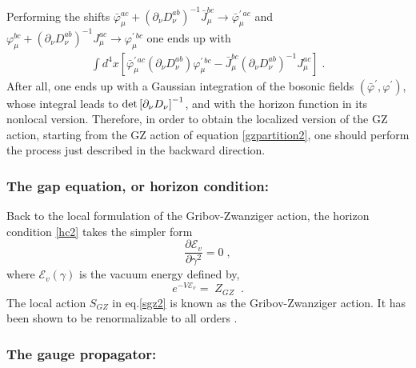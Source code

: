 Performing the shifts $ {\bar\varphi}^{ac}_{\mu}  + (\partial_\nu D^{ab}_{\nu}
)^{-1}\bar{J}^{bc}_{\mu} \to \bar{\varphi}^{\prime\, ac}_{\mu}$ and
$ \varphi^{bc}_{\mu} + (\partial_\nu D^{ab}_{\nu})^{-1} J^{ac}_{\mu} \to \varphi^{\prime\,
bc}_{\mu}$ one ends up with
\begin{eqnarray}
\int d^{4}x \left[ 
{\bar \varphi}^{\prime\, ac}_{\mu} (\partial_\nu D^{ab}_{\nu} ) \varphi^{\prime\, bc}_{\mu}  
- \bar{J}^{bc}_{\mu}(\partial_\nu D^{ab}_{\nu} )^{-1}J^{ac}_{\mu}
\right]\;.
\label{act10}
\end{eqnarray}
After all, one ends up with a Gaussian integration of the bosonic fields
$(\bar{\varphi}^{\prime},\varphi^{\prime})$, whose integral leads to $\det\left[ \partial_{\nu}D_{\nu} \right]^{-1}$,
and with the horizon function in its nonlocal version. Therefore, in order to obtain the
localized version of the GZ action, starting from the GZ action of equation
\eqref{gzpartition2}, one should perform the process just described in the backward direction.


\subsubsection{The gap equation, or horizon condition:}


Back to the local formulation of the Gribov-Zwanziger action, the horizon condition \eqref{hc2}
takes the simpler form 
\begin{equation}
 \frac{\partial \mathcal{E}_v}{\partial\gamma^2}=0\;,   
\label{ggap}
\end{equation}
where $\mathcal{E}_{v}(\gamma)$ is the vacuum energy defined by,
\begin{equation}
 e^{-V\mathcal{E}_{v}}=\;Z_{GZ}\;  
\label{vce2} \;.
\end{equation}
The local action $S_{GZ}$ in eq.\eqref{sgz2} is known as the Gribov-Zwanziger action. It has
been shown to be renormalizable to all orders
\cite{Zwanziger:1988jt,Zwanziger:1989mf,Zwanziger:1992qr}. 


\subsubsection{The gauge propagator:}

